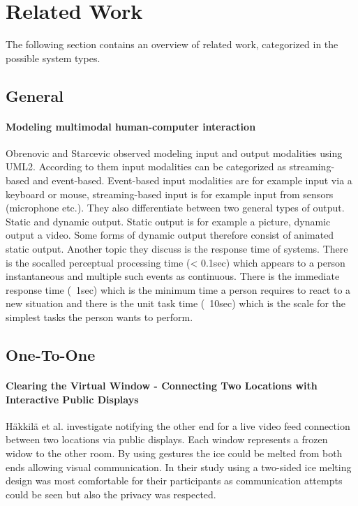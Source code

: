 \section{Related Work}
The following section contains an overview of related work, categorized in the possible system types.

\subsection{General}
\paragraph{Modeling multimodal human-computer interaction}
Obrenovic and Starcevic \cite{obrenovic_modeling_2004} observed modeling input and output modalities using UML2.
According to them input modalities can be categorized as streaming-based and event-based.
Event-based input modalities are for example input via a keyboard or mouse, streaming-based input is for example input from sensors (microphone etc.).
They also differentiate between two general types of output.
Static and dynamic output.
Static output is for example a picture, dynamic output a video.
Some forms of dynamic output therefore consist of animated static output.
Another topic they discuss is the response time of systems.
There is the socalled perceptual processing time (< 0.1sec) which appears to a person instantaneous and multiple such events as continuous.
There is the immediate response time (~1sec) which is the minimum time a person requires to react to a new situation and there is the unit task time (~10sec) which is the scale for the simplest tasks the person wants to perform.

\subsection{One-To-One}

\paragraph{Clearing the Virtual Window - Connecting Two Locations
with Interactive Public Displays }
Häkkilä et al. \cite{hakkila_clearing_2013} investigate notifying the other end for a live video feed connection between two locations via public displays.
Each window represents a frozen widow to the other room.
By using gestures the ice could be melted from both ends allowing visual communication.
In their study using a two-sided ice melting design was most comfortable for their participants as communication attempts could be seen but also the privacy was respected.

